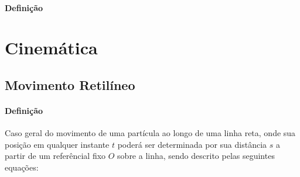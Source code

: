 \documentclass{article}
\begin{document}
            \paragraph{Definição}
\newpage

    \section{Cinemática}
        \subsection{Movimento Retilíneo}
            \paragraph{Definição}Caso geral do movimento de uma partícula ao longo de uma linha reta, onde sua posição em qualquer instante $t$ poderá ser determinada por sua distância $s$ a partir de um referêncial fixo $O$ sobre a linha, sendo descrito pelas seguintes equações:
\end{document}
